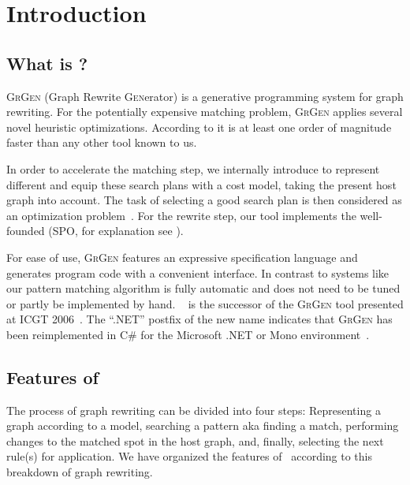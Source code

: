 \chapter{Introduction}


\section{What is \GrG?}

{\scshape GrGen} (\textsc{G}raph \textsc{R}ewrite \textsc{Gen}erator) is a generative programming system for graph rewriting.
For the potentially expensive matching problem, {\scshape GrGen} applies several novel heuristic optimizations.
According to  it is at least one order of magnitude faster than any other tool known to us.

In order to accelerate the matching step, we internally introduce  to represent different  and equip these search plans with a cost model, taking the present host graph into account.
The task of selecting a good search plan is then considered as an optimization problem~\cite{BKG:07,Bat:06}.
For the rewrite step, our tool implements the well-founded  (SPO, for explanation see \cite{spoapproach}).

For ease of use, {\scshape GrGen} features an expressive specification language and generates program code with a convenient interface.
In contrast to systems like  \cite{fujaba} our pattern matching algorithm is fully automatic and does not need to be tuned or partly be implemented by hand.
\GrG~\cite{grgen_web} is the successor of the \textsc{GrGen} tool presented at ICGT 2006~\cite{GBGHS:06}. 
The ``.NET'' postfix of the new name indicates that \textsc{GrGen} has been reimplemented in C\# for the Microsoft .NET or Mono environment~\cite{NET,MONO}.


\section{Features of \GrG}

The process of graph rewriting can be divided into four steps:
Representing a graph according to a model, searching a pattern aka finding a match, performing changes to the matched spot in the host graph, and, finally, selecting the next rule(s) for application.
We have organized the features of \GrG\ according to this breakdown of graph rewriting.

